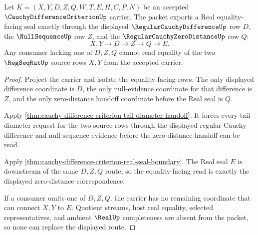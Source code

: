 \begin{theorem}
\label{thm:cauchy-difference-criterion-zero-distance-correspondence}
Let $K=(X,Y,D,Z,Q,W,T,E,H,C,P,N)$ be an accepted $\CauchyDifferenceCriterionUp$ carrier. The packet exports a Real equality-facing seal exactly through the displayed $\RegularCauchyDifferenceUp$ row $D$, the $\NullSequenceUp$ row $Z$, and the $\RegularCauchyZeroDistanceUp$ row $Q$:
$$
X,Y \longrightarrow D \longrightarrow Z \longrightarrow Q \longrightarrow E .
$$
Any consumer lacking one of $D,Z,Q$ cannot read equality of the two $\RegSeqRatUp$ source rows $X,Y$ from the accepted carrier.
\end{theorem}
\begin{proof}
Project the carrier and isolate the equality-facing rows. The only displayed difference coordinate is $D$, the only null-evidence coordinate for that difference is $Z$, and the only zero-distance handoff coordinate before the Real seal is $Q$.

Apply \autoref{thm:cauchy-difference-criterion-tail-diameter-handoff}. It forces every tail-diameter request for the two source rows through the displayed regular-Cauchy difference and null-sequence evidence before the zero-distance handoff can be read.

Apply \autoref{thm:cauchy-difference-criterion-real-seal-boundary}. The Real seal $E$ is downstream of the same $D,Z,Q$ route, so the equality-facing read is exactly the displayed zero-distance correspondence.

If a consumer omits one of $D,Z,Q$, the carrier has no remaining coordinate that can connect $X,Y$ to $E$. Quotient streams, host real equality, selected representatives, and ambient $\RealUp$ completeness are absent from the packet, so none can replace the displayed route.
\end{proof}

